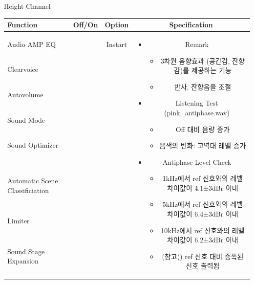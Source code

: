 \documentclass{beamer}
\begin{document}
	
	\begin{frame}[t]{Height Channel}
		\begin{tiny}
			\begin{tabular}{@{}lccc@{}}
				\toprule
				Function & Off/On & Option & Specification \\
				\midrule
				Audio AMP EQ & \color{black}{Off} & Instart &
				\multirow{14}{60mm}{
					\begin{itemize}
						\item Remark
						\begin{itemize}
							\item 3차원 음향효과 (공간감, 잔향감)를 제공하는 기능
							\item 반사, 잔향음을 조절
						\end{itemize}
						\item Listening Test (pink\_antiphase.wav)
						\begin{itemize}
							\item Off 대비 음량 증가
							\item 음색의 변화: 고역대 레벨 증가
						\end{itemize}
						\item Antiphase Level Check
						\begin{itemize}
							\item 1kHz에서 ref 신호와의 레벨 차이값이 4.1±3dBr 이내
							\item 5kHz에서 ref 신호와의 레벨 차이값이 6.4±3dBr 이내
							\item 10kHz에서 ref 신호와의 레벨 차이값이 6.2±3dBr 이내
							\item (참고)) ref 신호 대비 증폭된 신호 출력됨
						\end{itemize}
					\end{itemize}
				} \\
				Clearvoice & \color{black}{Off} & & \\
				Autovolume & \color{black}{Off} & & \\
				Sound Mode & \color{black}{Off} & & \\
				Sound Optimizer & \color{black}{Off} & & \\
				\color{blue}{Height Channel} & \color{blue}{On} & & \\
				Automatic Scene Classificiation & \color{black}{Off} & & \\
				Limiter & \color{black}{Off} & & \\
				Sound Stage Expansion & \color{black}{Off} & & \\

\end{tabular}
\end{tiny}
\end{frame}
\end{document}
